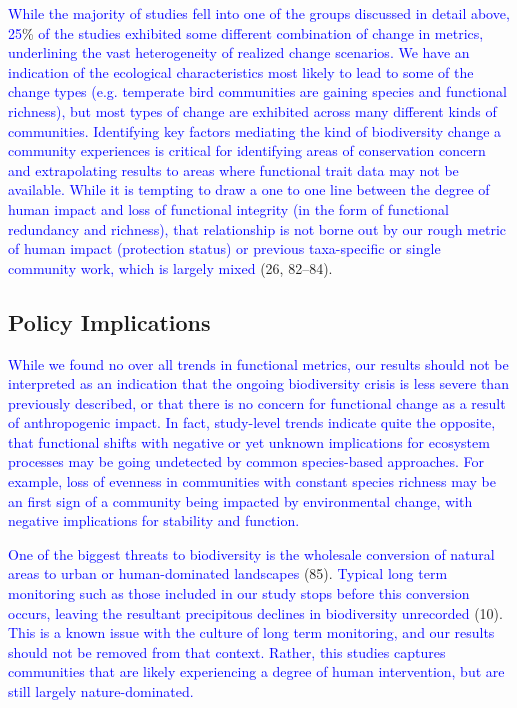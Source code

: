 \documentclass{article}
\begin{document}
\textcolor{blue}{While the majority of studies fell into one of the groups discussed in detail above, 25}\%
\textcolor{blue}{of the studies exhibited some different combination of change in metrics, underlining the vast heterogeneity of realized change scenarios.}
\textcolor{blue}{We have an indication of the ecological characteristics most likely to lead to some of the change types (e.g. temperate bird communities are gaining species and functional richness), but most types of change are exhibited across many different kinds of communities. }
\textcolor{blue}{Identifying key factors mediating the kind of biodiversity change a community experiences is critical for identifying areas of conservation concern and extrapolating results to areas where functional trait data may not be available. While it is tempting to draw a one to one line between the degree of human impact and loss of functional integrity (in the form of functional redundancy and richness), that relationship is not borne out by our rough metric of human impact (protection status) or previous taxa-specific or single community work, which is largely mixed}
(26, 82--84).

\hypertarget{policy-implications}{%
\subsection{Policy Implications}\label{policy-implications}}

\textcolor{blue}{While we found no over all trends in functional metrics, our results should not be interpreted as an indication that the ongoing biodiversity crisis is less severe than previously described, or that there is no concern for functional change as a result of anthropogenic impact. In fact, study-level trends indicate quite the opposite, that functional shifts with negative or yet unknown implications for ecosystem processes may be going undetected by common species-based approaches. For example, loss of evenness in communities with constant species richness may be an first sign of a community being impacted by environmental change, with negative implications for stability and function.}

\textcolor{blue}{One of the biggest threats to biodiversity is the wholesale conversion of natural areas to urban or human-dominated landscapes }(85).
\textcolor{blue}{Typical long term monitoring such as those included in our study stops before this conversion occurs, leaving the resultant precipitous declines in biodiversity unrecorded}
(10).
\textcolor{blue}{This is a known issue with the culture of long term monitoring, and our results should not be removed from that context. Rather, this studies captures communities that are likely experiencing a degree of human intervention, but are still largely nature-dominated.}
\end{document}

